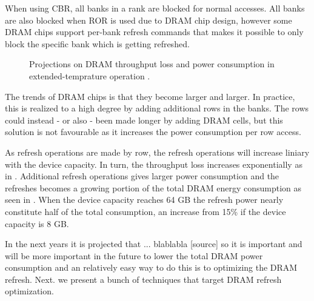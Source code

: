 When using CBR, all banks in a rank are blocked for normal accesses. All banks are also blocked when ROR is used due to DRAM chip design, however some DRAM chips support per-bank refresh commands that makes it possible to only block the specific bank which is getting refreshed. 

\begin{figure}[t]
    \centering
    \caption{Projections on DRAM throughput loss and power consumption in extended-temprature operation \cite{raidr}.}
    \label{fig:dram_data_proj}
\end{figure}

The trends of DRAM chips is that they become larger and larger. In practice, this is realized to a high degree by adding additional rows in the banks. The rows could instead - or also - been made longer by adding DRAM cells, but this solution is not favourable as it increases the power consumption per row access. 

As refresh operations are made by row, the refresh operations will increase liniary with the device capacity. In turn, the throughput loss increases exponentially as in . Additional refresh operations gives larger power consumption and the refreshes becomes a growing portion of the total DRAM energy consumption as seen in . When the device capacity reaches 64 GB the refresh power nearly constitute half of the total consumption, an increase from 15\% if the device capacity is 8 GB. 


In the next years it is projected that ... blablabla [source] so it is important and will be more important in the future to lower the total DRAM power consumption and an relatively easy way to do this is to optimizing the DRAM refresh. Next. we present a bunch of techniques that target DRAM refresh optimization.
